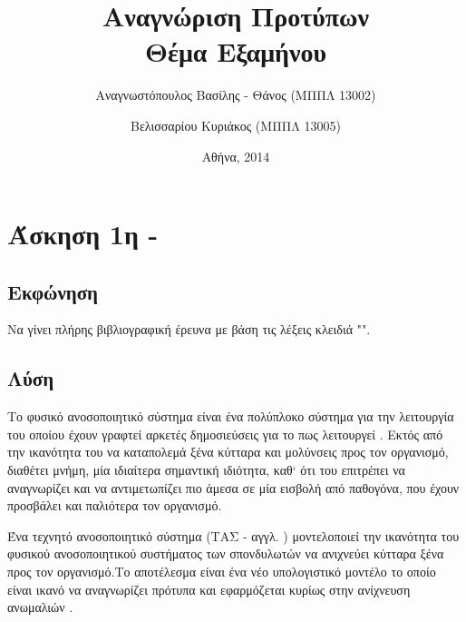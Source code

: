 \documentclass{assignment}
\title{Αναγνώριση Προτύπων \\ Θέμα Εξαμήνου }
\date{Αθήνα, 2014}
\author{Αναγνωστόπουλος Βασίλης - Θάνος (ΜΠΠΛ 13002) \and Βελισσαρίου Κυριάκος (ΜΠΠΛ 13005)}
\begin{document}
\maketitle

\setcounter{page}{1} 

\pagestyle{plain}
\tableofcontents
\listoffigures

\makeatletter
\newcommand{\newalgname}[1]{%
  \renewcommand{\ALG@name}{#1}%
}
\newalgname{Αλγόριθμος}
\renewcommand{\listalgorithmname}{Κατάλογος αλγορίθμων}
\makeatother

\listofalgorithms

\renewcommand\listoflistingscaption{Κατάλογος πηγαίου κώδικα}
\renewcommand\listingscaption{Πηγαίος κώδικας}

\listoflistings
\newpage

\setcounter{page}{1} 

\section{Άσκηση 1η - }
\subsection{Εκφώνηση}

Να γίνει πλήρης βιβλιογραφική έρευνα με βάση τις λέξεις κλειδιά "".

\subsection {Λύση}

Το φυσικό ανοσοποιητικό σύστημα είναι ένα πολύπλοκο σύστημα για την λειτουργία του οποίου έχουν γραφτεί αρκετές δημοσιεύσεις για το πως λειτουργεί \cite{wiki:immune_system}. Εκτός από την ικανότητα του να καταπολεμά ξένα κύτταρα και μολύνσεις προς τον οργανισμό, διαθέτει μνήμη, μία ιδιαίτερα σημαντική ιδιότητα, καθ` ότι του επιτρέπει να αναγνωρίζει και να αντιμετωπίζει πιο άμεσα σε μία εισβολή από παθογόνα, που έχουν προσβάλει και παλιότερα τον οργανισμό. 

Ένα τεχνητό ανοσοποιητικό σύστημα (ΤΑΣ - αγγλ. ) μοντελοποιεί την ικανότητα του φυσικού ανοσοποιητικού συστήματος των σπονδυλωτών να ανιχνεύει κύτταρα ξένα προς τον οργανισμό.Το αποτέλεσμα είναι ένα νέο υπολογιστικό μοντέλο το οποίο είναι ικανό να αναγνωρίζει πρότυπα και εφαρμόζεται κυρίως στην ανίχνευση ανωμαλιών \cite{engelbrecht,wiki:artificial_immune_system}.
\end{document}
